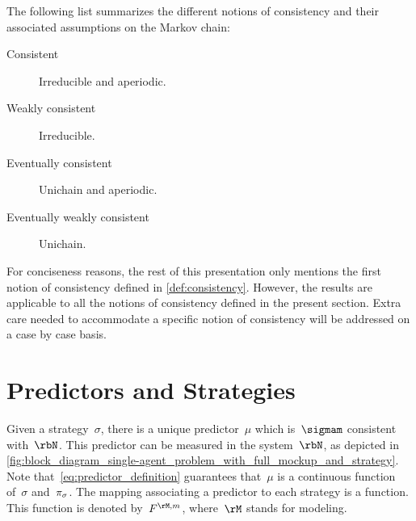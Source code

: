 The following list summarizes the different notions of consistency and their associated assumptions on the Markov chain:
\begin{description}
\item[Consistent] Irreducible and aperiodic.
\item[Weakly consistent] Irreducible.
\item[Eventually consistent] Unichain and aperiodic.
\item[Eventually weakly consistent] Unichain.
\end{description}

For conciseness reasons, the rest of this presentation only mentions the first notion of consistency defined in \cref{def:consistency}.
However, the results are applicable to all the notions of consistency defined in the present section.
Extra care needed to accommodate a specific notion of consistency will be addressed on a case by case basis.

\section{Predictors and Strategies}
\label{sec:predictors_and_strategies}

Given a strategy~\(\sigma\), there is a unique predictor~\(\mu\) which is~\(\sigmam\) consistent with~\(\rbN\).
This predictor can be measured in the system~\(\rbN\), as depicted in \cref{fig:block_diagram_single-agent_problem_with_full_mockup_and_strategy}.
Note that~\cref{eq:predictor_definition} guarantees that~\(\mu\) is a continuous function of~\(\sigma\) and~\(\pi_{\sigma}\).
The mapping associating a predictor to each strategy is a function.
This function is denoted by~\(\FM\), where~\(\rM\) stands for modeling.

